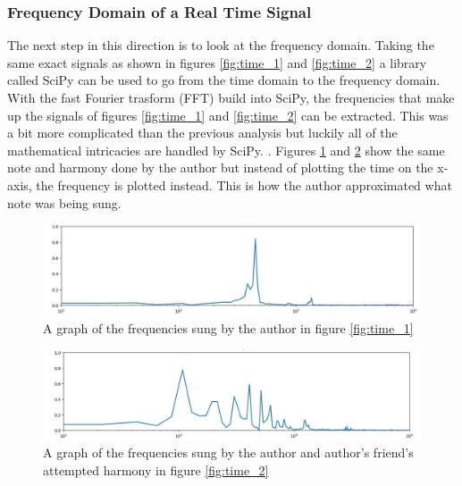\documentclass[10pt]{article}
\begin{document}
\subsubsection{Frequency Domain of a Real Time Signal}
\noindent\hspace{\parindent}The next step in this direction is to look at the frequency domain. Taking the same exact signals as shown in figures \ref{fig:time_1} and \ref{fig:time_2} a library called SciPy can be used to go from the time domain to the frequency domain. With the fast Fourier trasform (FFT) build into SciPy, the frequencies that make up the signals of figures \ref{fig:time_1} and \ref{fig:time_2} can be extracted. This was a bit more complicated than the previous analysis but luckily all of the mathematical intricacies are handled by SciPy.  \cite{scipy}. 
Figures \ref{fig:frequency_1} and \ref{fig:frequency_2} show the same note and harmony done by the author but instead of plotting the time on the x-axis, the frequency is plotted instead. This is how the author approximated what note was being sung.

\begin{figure}[H]
    \centering
    \includegraphics[width=1.05\textwidth]{Alan_1_freq}
    \caption{A graph of the frequencies sung by the author in figure \ref{fig:time_1}}
    \label{fig:frequency_1}
\end{figure}

\begin{figure}[H]
    \centering
    \includegraphics[width=1.05\textwidth]{Matt_1_freq}
    \caption{A graph of the frequencies sung by the author and author's friend's attempted harmony in figure \ref{fig:time_2}}
    \label{fig:frequency_2}
\end{figure}
\end{document}

